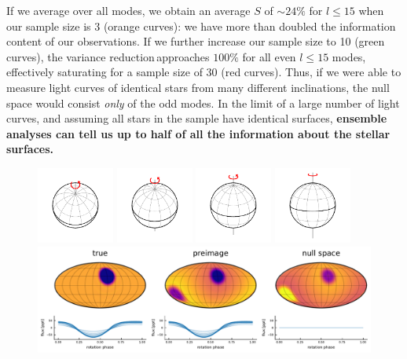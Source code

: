\documentclass[modern,linenumbers]{aastex62}
\newcommand{\shrinkage}{{variance reduction\,}}
\begin{document}
If we average over all modes, we obtain an average $S$ of $\sim 24\%$
for $l\leq15$ when our sample size is 3 (orange curves): we have more than doubled the
information content of our observations. If we further increase our sample size
to 10 (green curves), the \shrinkage approaches $100\%$ for all even $l\leq15$
modes, effectively saturating for a sample size of 30 (red curves).
Thus, if we were able to measure light curves of identical stars
from many different inclinations, the null space would consist \emph{only}
of the odd modes. In the limit of a large number of light curves,
and assuming all stars in the sample have identical surfaces,
\textbf{ensemble analyses can tell us up to
    half of all the information about the stellar surfaces.}

\begin{figure}[p!]
    \begin{centering}
        \vspace{-4em}
        \includegraphics[width=1in]{figures/wireframe_30.pdf}
        \includegraphics[width=1in]{figures/wireframe_45.pdf}
        \includegraphics[width=1in]{figures/wireframe_60.pdf}
        \includegraphics[width=1in]{figures/wireframe_75.pdf}
        \\[0.5em]
        \includegraphics[width=\linewidth]{figures/nullspace_preimage_a.pdf}

\end{centering}
\end{figure}
\end{document}
